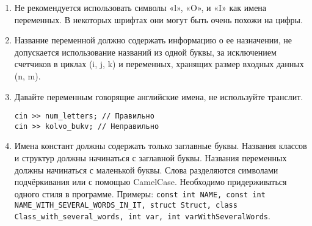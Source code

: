 \documentclass[10pt]{article}
\begin{document}
\begin{enumerate}

\item Не рекомендуется использовать символы «l», «O», и «I» как имена переменных. В некоторых шрифтах они могут быть очень похожи на цифры.

\item Название переменной должно содержать информацию о ее назначении, не допускается использование названий из одной буквы, за исключением счетчиков в циклах (i, j, k) и переменных, хранящих размер входных данных (n, m).

\item Давайте переменным говорящие английские имена, не используйте транслит.

\begin{lstlisting}
cin >> num_letters; // Правильно
cin >> kolvo_bukv; // Неправильно
\end{lstlisting}

\item Имена констант должны содержать только заглавные буквы. Названия классов и структур должны начинаться с заглавной буквы. Названия
переменных должны начинаться с маленькой буквы. Слова разделяются символами подчёркивания или с помощью CamelCase. Необходимо придерживаться одного
стиля в программе.
Примеры: \texttt{const int NAME, const int NAME\_WITH\_SEVERAL\_WORDS\_IN\_IT, struct Struct, class Class\_with\_several\_words, int var, int varWithSeveralWords}.

\end{enumerate}
\end{document}
